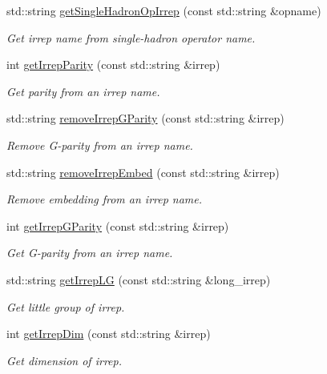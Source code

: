 \begin{DoxyCompactItemize}
std\+::string \mbox{\hyperlink{namespaceHadron_a9b05418ba46746a99fb402de358096d3}{get\+Single\+Hadron\+Op\+Irrep}} (const std\+::string \&opname)
\begin{DoxyCompactList}\small\item\em Get irrep name from single-\/hadron operator name. \end{DoxyCompactList}\item 
int \mbox{\hyperlink{namespaceHadron_af182dccf3462f82247a3d86df38c2da0}{get\+Irrep\+Parity}} (const std\+::string \&irrep)
\begin{DoxyCompactList}\small\item\em Get parity from an irrep name. \end{DoxyCompactList}\item 
std\+::string \mbox{\hyperlink{namespaceHadron_a6c2109897dff664c15b3fe81aa7d8917}{remove\+Irrep\+G\+Parity}} (const std\+::string \&irrep)
\begin{DoxyCompactList}\small\item\em Remove G-\/parity from an irrep name. \end{DoxyCompactList}\item 
std\+::string \mbox{\hyperlink{namespaceHadron_a828226a1b80591d5791be7e1bc155220}{remove\+Irrep\+Embed}} (const std\+::string \&irrep)
\begin{DoxyCompactList}\small\item\em Remove embedding from an irrep name. \end{DoxyCompactList}\item 
int \mbox{\hyperlink{namespaceHadron_a951cfb9d3a3b24aaf558d2e22513cec1}{get\+Irrep\+G\+Parity}} (const std\+::string \&irrep)
\begin{DoxyCompactList}\small\item\em Get G-\/parity from an irrep name. \end{DoxyCompactList}\item 
std\+::string \mbox{\hyperlink{namespaceHadron_a79373fb0ae210931217ae33dc98f5ee9}{get\+Irrep\+LG}} (const std\+::string \&long\+\_\+irrep)
\begin{DoxyCompactList}\small\item\em Get little group of irrep. \end{DoxyCompactList}\item 
int \mbox{\hyperlink{namespaceHadron_a0451202d2f27c90c438c0d23da609c62}{get\+Irrep\+Dim}} (const std\+::string \&irrep)
\begin{DoxyCompactList}\small\item\em Get dimension of irrep. \end{DoxyCompactList}\item 

\end{DoxyCompactItemize}
